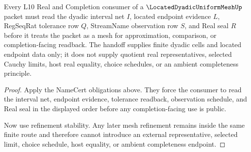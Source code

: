 \begin{theorem}
\label{thm:located-dyadic-uniform-mesh-l10-handoff}
Every L10 Real and Completion consumer of a $\LocatedDyadicUniformMeshUp$ packet must read the dyadic interval net $I$, located endpoint evidence $L$, RegSeqRat tolerance row $Q$, StreamName observation row $S$, and Real seal $R$ before it treats the packet as a mesh for approximation, comparison, or completion-facing readback. The handoff supplies finite dyadic cells and located endpoint data only; it does not supply quotient real representatives, selected Cauchy limits, host real equality, choice schedules, or an ambient completeness principle.
\end{theorem}
\begin{proof}
Apply the NameCert obligations above. They force the consumer to read the interval net, endpoint evidence, tolerance readback, observation schedule, and Real seal in the displayed order before any completion-facing use is public.

Now use refinement stability. Any later mesh refinement remains inside the same finite route and therefore cannot introduce an external representative, selected limit, choice schedule, host equality, or ambient completeness endpoint.
\end{proof}

\begin{closurestatus}{\LocatedDyadicUniformMeshUp}
  \theoryclosure{\seedClosure}
  \formalstatus{\formalTargetV}
\end{closurestatus}
